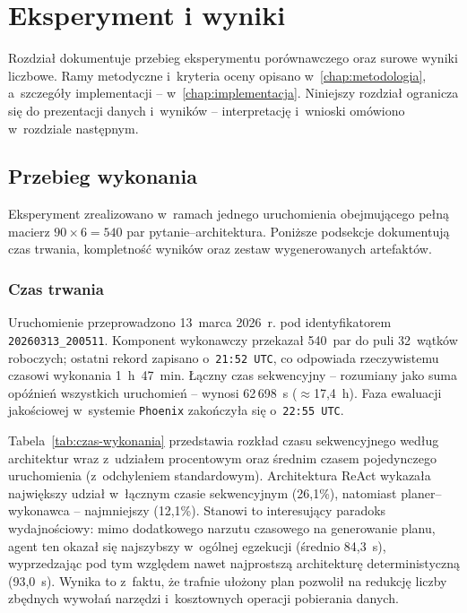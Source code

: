 \chapter{Eksperyment i wyniki}\label{chap:eksperyment-i-wyniki}

Rozdział dokumentuje przebieg eksperymentu porównawczego oraz surowe wyniki
liczbowe. Ramy metodyczne i~kryteria oceny opisano w~\cref{chap:metodologia},
a~szczegóły implementacji -- w~\cref{chap:implementacja}. Niniejszy rozdział
ogranicza się do prezentacji danych i~wyników -- interpretację i~wnioski
omówiono w~rozdziale następnym.

\section{Przebieg wykonania}\label{sec:przebieg-wykonania}

Eksperyment zrealizowano w~ramach jednego uruchomienia obejmującego pełną
macierz \(90 \times 6 = 540\) par pytanie--architektura. Poniższe podsekcje
dokumentują czas trwania, kompletność wyników oraz zestaw wygenerowanych
artefaktów.

\subsection{Czas trwania}\label{subsec:czas-trwania}

Uruchomienie przeprowadzono 13~marca 2026~r. pod identyfikatorem
\texttt{20260313\_200511}. Komponent wykonawczy przekazał 540~par do puli
32~wątków roboczych; ostatni rekord zapisano o~\texttt{21:52~UTC}, co odpowiada
rzeczywistemu czasowi wykonania \mbox{1~h~47~min}. Łączny czas sekwencyjny --
rozumiany jako suma opóźnień wszystkich uruchomień -- wynosi \mbox{62\,698~s}
(\(\approx\)17{,}4~h). Faza ewaluacji jakościowej w~systemie \texttt{Phoenix}
zakończyła się o~\texttt{22:55~UTC}.

Tabela~\ref{tab:czas-wykonania} przedstawia rozkład czasu sekwencyjnego według
architektur wraz z~udziałem procentowym oraz średnim czasem pojedynczego
uruchomienia (z~odchyleniem standardowym). Architektura ReAct wykazała
największy udział w~łącznym czasie sekwencyjnym (26,1\%), natomiast
planer--wykonawca -- najmniejszy (12,1\%). Stanowi to interesujący paradoks
wydajnościowy: mimo dodatkowego narzutu czasowego na generowanie planu,
agent ten okazał się najszybszy w~ogólnej egzekucji (średnio 84{,}3~s),
wyprzedzając pod tym względem nawet najprostszą architekturę deterministyczną
(93{,}0~s). Wynika to z~faktu, że trafnie ułożony plan pozwolił na redukcję
liczby zbędnych wywołań narzędzi i~kosztownych operacji pobierania danych.

